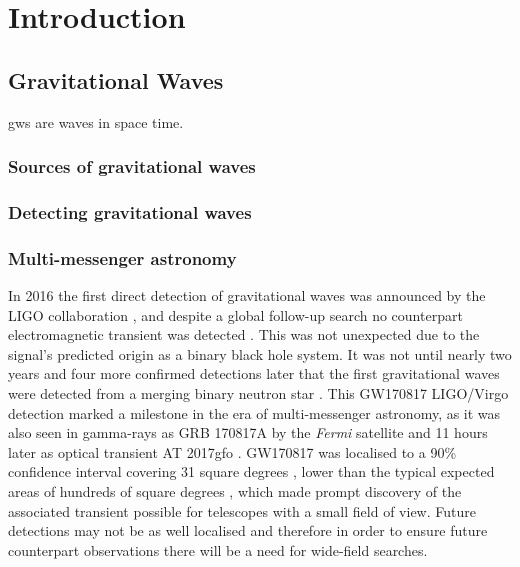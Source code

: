 \chapter{Introduction}
\label{chap:intro}
\chaptoc{}

\newpage
\section{Gravitational Waves}
\label{sec:gw}

\glspl{gw} are waves in space time.

\lipsum{}


\subsection{Sources of gravitational waves}
\label{sec:gw-sources}

\lipsum{}


\subsection{Detecting gravitational waves}
\label{sec:gw-detect}

\lipsum{}

\subsection{Multi-messenger astronomy}
\label{sec:gw-multimessenger}

In 2016 the first direct detection of gravitational waves was announced by the LIGO collaboration \cite{PhysRevLett.116.061102}, and despite a global follow-up search no counterpart electromagnetic transient was detected \cite{2016ApJ...826L..13A}. This was not unexpected due to the signal's predicted origin as a binary black hole system. It was not until nearly two years and four more confirmed detections later that the first gravitational waves were detected from a merging binary neutron star \cite{PhysRevLett.119.161101}. This GW170817 LIGO/Virgo detection marked a milestone in the era of multi-messenger astronomy, as it was also seen in gamma-rays as GRB 170817A by the \textit{Fermi} satellite and 11 hours later as optical transient AT 2017gfo \cite{2017ApJ...848L..12A}. GW170817 was localised to a 90\% confidence interval covering 31 square degrees \cite{2017ApJ...848L..12A}, lower than the typical expected areas of hundreds of square degrees \cite{0004-637X-795-2-105}, which made prompt discovery of the associated transient possible for telescopes with a small field of view. Future detections may not be as well localised and therefore in order to ensure future counterpart observations there will be a need for wide-field searches.


